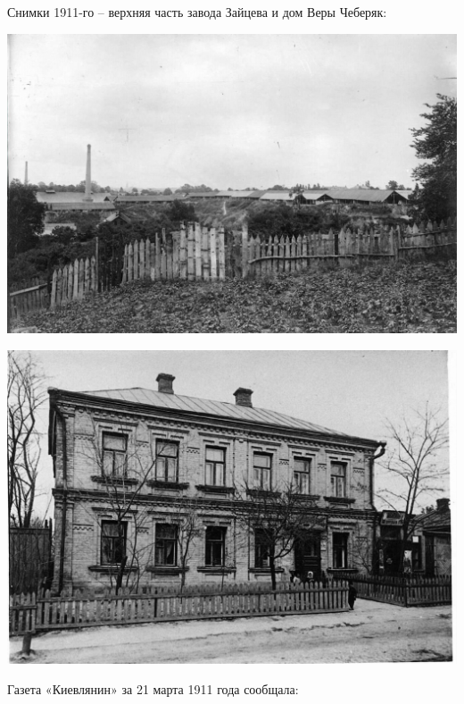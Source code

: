 Снимки 1911-го – верхняя часть завода Зайцева и дом Веры Чеберяк:
\vspace*{\fill}
\begin{center}
\includegraphics[width=\linewidth]{chast-kirvys/beylis/1911.jpg}
\end{center}

\begin{center}
\includegraphics[width=\linewidth]{chast-kirvys/beylis/domcheber.jpg}
\end{center}
\vspace*{\fill}
\newpage


Газета «Киевлянин» за 21 марта 1911 года сообщала:

